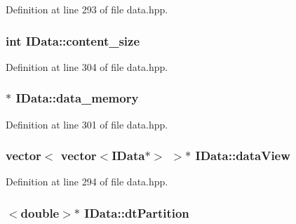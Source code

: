 Definition at line 293 of file data.hpp.\hypertarget{class_i_data_a15b74bcf67e36b559c1fdbf5192206b8}{
\subsubsection[{content\_\-size}]{\setlength{\rightskip}{0pt plus 5cm}int {\bf IData::content\_\-size}}}
\label{class_i_data_a15b74bcf67e36b559c1fdbf5192206b8}


Definition at line 304 of file data.hpp.\hypertarget{class_i_data_aabd7b42672ec3479c2e6a77fac395789}{
\subsubsection[{data\_\-memory}]{$\ast$ {\bf IData::data\_\-memory}}}
\label{class_i_data_aabd7b42672ec3479c2e6a77fac395789}


Definition at line 301 of file data.hpp.\hypertarget{class_i_data_a952b0193f67329eccb52f4f6552a8b38}{
\subsubsection[{dataView}]{\setlength{\rightskip}{0pt plus 5cm}vector$<$ vector$<${\bf IData}$\ast$$>$ $>$$\ast$ {\bf IData::dataView}}}
\label{class_i_data_a952b0193f67329eccb52f4f6552a8b38}


Definition at line 294 of file data.hpp.\hypertarget{class_i_data_a97916f47cd9feed0aad32c066172536f}{
\subsubsection[{dtPartition}]{$<$double$>$$\ast$ {\bf IData::dtPartition}}}
\label{class_i_data_a97916f47cd9feed0aad32c066172536f}


